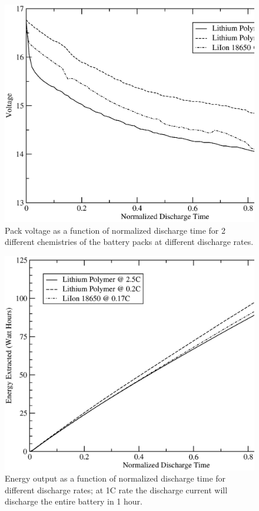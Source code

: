 \documentclass{ifacconf}
\begin{document}
\begin{figure}[thpb]
  \centering
  \includegraphics[scale=0.33]{Figures/V_versus_T.eps}
  \caption{Pack voltage as a function of normalized discharge time for 2 different chemistries of the
  battery packs at different discharge rates.}
  \label{fig:Batt_v_vs_t}
\end{figure}
\begin{figure}[thpb]
  \centering
  \includegraphics[scale=0.33]{Figures/Energy_v_time.eps}
  \caption{Energy output as a function of normalized discharge time for different discharge rates; at 1C
  rate the discharge current will discharge the entire battery in 1 hour.}
  \label{fig:Batt_e_vs_t}
\end{figure}
\end{document}
